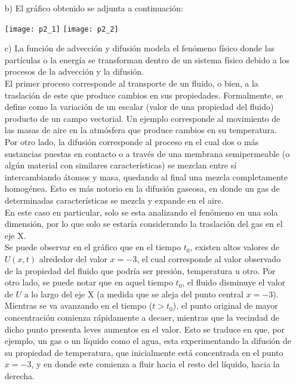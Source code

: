 \documentclass[letterpaper]{article}
\newcommand{\5}
{
\\[.5cm]
}
\begin{document}
\begin{itemize}
\item[b)] El gráfico obtenido se adjunta a continuación: \\
\begin{center}
\centerline{%
  \texttt{[image: p2\_1]}%
  \texttt{[image: p2\_2]}%
}%
\end{center}
\item[c)] La función de advección y difusión modela el fenómeno físico donde las partículas o la energía se transforman dentro de un sistema físico debido a los procesos de la advección y la difusión. \\[0.2cm]
El primer proceso corresponde al transporte de un fluido, o bien, a la traslación de este que produce cambios en sus propiedades. Formalmente, se define como la variación de un escalar (valor de una propiedad del fluido) producto de un campo vectorial. Un ejemplo corresponde al movimiento de las masas de aire en la atmósfera que produce cambios en su temperatura.\\[0.2cm]
Por otro lado, la difusión corresponde al proceso en el cual dos o más sustancias puestas en contacto o a través de una membrana semipermeable (o algún material con similares características) se mezclan entre sí intercambiando átomos y masa, quedando al final una mezcla completamente homogénea. Esto es más notorio en la difusión gaseosa, en donde un gas de determinadas características se mezcla y expande en el aire. \\[0.2cm]
En este caso en particular, solo se esta analizando el fenómeno en una sola dimensión, por lo que solo se estaría considerando la traslación del gas en el eje X. \\[0.2cm]
Se puede observar en el gráfico que en el tiempo $t_0$, existen altos valores de $U(x, t)$ alrededor del valor $x = -3$, el cual corresponde al valor observado de la propiedad del fluido que podría ser presión, temperatura u otro. Por otro lado, se puede notar que en aquel tiempo $t_0$, el fluido disminuye el valor de $U$ a lo largo del eje X (a medida que se aleja del punto central $x = -3$).  \\[0.2cm]
Mientras se va avanzando en el tiempo ($t > t_0$), el punto original de mayor concentración comienza rápidamente a decaer, mientras que la vecindad de dicho punto presenta leves aumentos en el valor. Esto se traduce en que, por ejemplo, un gas o un líquido como el agua, esta experimentando la difusión de su propiedad de temperatura, que inicialmente está concentrada en el punto $x = -3$, y en donde este comienza a fluir hacia el resto del líquido, hacia la derecha. \\[0.2cm]

\end{itemize}
\end{document}
